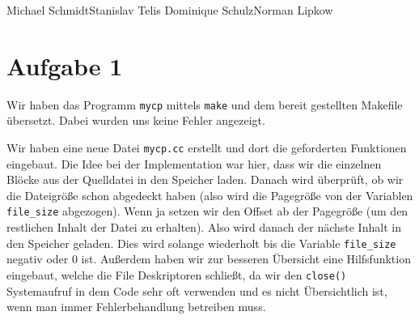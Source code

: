 \documentclass{ti2}
\begin{document}
%
                {Michael Schmidt}{Stanislav Telis}%
                {Dominique Schulz}{Norman Lipkow}%
                  

\section*{Aufgabe 1}
Wir haben das Programm \texttt{mycp} mittels \texttt{make} und dem bereit gestellten Makefile übersetzt. Dabei wurden uns keine Fehler angezeigt.

\par

Wir haben eine neue Datei \texttt{mycp.cc} erstellt und dort die geforderten Funktionen eingebaut.
Die Idee bei der Implementation war hier, dass wir die einzelnen Blöcke aus der Quelldatei in den Speicher laden. Danach wird überprüft, ob wir die Dateigröße schon abgedeckt haben (also wird die Pagegröße von der Variablen \texttt{file\_size} abgezogen). Wenn ja setzen wir den Offset ab der Pagegröße (um den restlichen Inhalt der Datei zu erhalten). Also wird danach der nächste Inhalt in den Speicher geladen. Dies wird solange wiederholt bis die Variable \texttt{file\_size} negativ oder 0 ist.
Außerdem haben wir zur besseren Übersicht eine Hilfsfunktion eingebaut, welche die File Deskriptoren schließt, da wir den \texttt{close()} Systemaufruf in dem Code sehr oft verwenden und es nicht Übersichtlich ist, wenn man immer Fehlerbehandlung betreiben muss.
\end{document}

